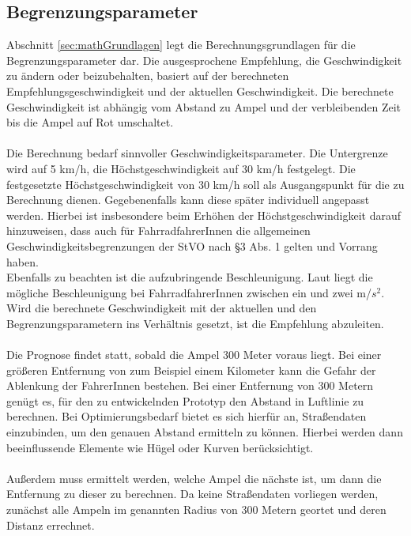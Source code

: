 \subsection{Begrenzungsparameter}
Abschnitt \ref{sec:mathGrundlagen} legt die Berechnungsgrundlagen für die Begrenzungsparameter dar. Die ausgesprochene Empfehlung, die Geschwindigkeit zu ändern oder beizubehalten, basiert auf der berechneten Empfehlungsgeschwindigkeit und der aktuellen Geschwindigkeit. Die berechnete Geschwindigkeit ist abhängig vom Abstand zu Ampel und der verbleibenden Zeit bis die Ampel auf Rot umschaltet.\\\\
Die Berechnung bedarf sinnvoller Geschwindigkeitsparameter. Die Untergrenze wird auf 5 km/h, die Höchstgeschwindigkeit auf 30 km/h festgelegt. Die festgesetzte Höchstgeschwindigkeit von 30 km/h soll als Ausgangspunkt für die zu Berechnung dienen. Gegebenenfalls kann diese später individuell angepasst werden. 
Hierbei ist insbesondere beim Erhöhen der Höchstgeschwindigkeit darauf hinzuweisen, dass auch für FahrradfahrerInnen die allgemeinen Geschwindigkeitsbegrenzungen der StVO nach \S 3 Abs. 1 gelten und Vorrang haben. \\
Ebenfalls zu beachten ist die aufzubringende Beschleunigung. Laut \cite{beschleunigung} liegt die mögliche Beschleunigung bei FahrradfahrerInnen zwischen ein und zwei m/$s^{2}$. Wird die berechnete Geschwindigkeit mit der aktuellen und den Begrenzungsparametern ins Verhältnis gesetzt, ist die Empfehlung abzuleiten.\\\\ 
Die Prognose findet statt, sobald die Ampel 300 Meter voraus liegt. Bei einer größeren Entfernung von zum Beispiel einem Kilometer kann die Gefahr der Ablenkung der FahrerInnen bestehen. Bei einer Entfernung von 300 Metern genügt es, für den zu entwickelnden Prototyp den Abstand in Luftlinie zu berechnen. Bei Optimierungsbedarf bietet es sich hierfür an, Straßendaten einzubinden, um den genauen Abstand ermitteln zu können. Hierbei werden dann beeinflussende Elemente wie Hügel oder Kurven berücksichtigt.\\\\
Außerdem muss ermittelt werden, welche Ampel die nächste ist, um dann die Entfernung zu dieser zu berechnen. Da keine Straßendaten vorliegen werden, zunächst alle Ampeln im genannten Radius von 300 Metern geortet und deren Distanz errechnet.
